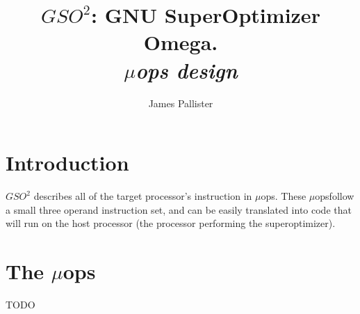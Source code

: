 \documentclass{article}
\title{$GSO^2$: GNU SuperOptimizer Omega. \\ \emph{ $\mu$ops design}}
\author{James Pallister}
\begin{document}
\maketitle
\newcommand{\uop}{$\mu$op}
\newcommand{\uops}{$\mu$ops}

\section{Introduction}

$GSO^2$ describes all of the target processor's instruction in $\mu$ops. These \uops follow a small three operand instruction set, and can be easily translated into code that will run on the host processor (the processor performing the superoptimizer).

\section{The \uops}

TODO
\end{document}
